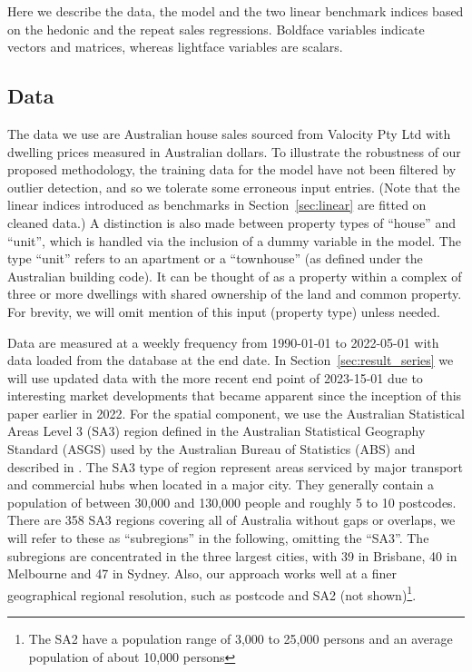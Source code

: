 Here we describe the data, the model and the two linear benchmark indices based on the hedonic and the repeat sales regressions. Boldface variables indicate vectors and matrices, whereas lightface variables are scalars.

\subsection{Data}
\label{sec:subregions}

The data we use are Australian house sales sourced from Valocity Pty Ltd with dwelling prices measured in Australian dollars. 
To illustrate the robustness of our proposed methodology, the training data for the model have not been filtered by outlier detection, and so we tolerate some erroneous input entries. (Note that the linear indices introduced as benchmarks in Section~\ref{sec:linear} are fitted on cleaned data.) A distinction is also made between property types of ``house'' and ``unit'', which is handled via the inclusion of a dummy variable in the model. The type “unit” refers to an apartment or a “townhouse” (as defined under the Australian building code). It can be thought of as a property within a complex of three or more dwellings with shared ownership of the land and common property. For brevity, we will omit mention of this input (property type) unless needed. 

Data are measured at a weekly frequency from 1990-01-01 to 2022-05-01 with data loaded from the database at the end date. In Section~\ref{sec:result_series} we will use updated data with the more recent end point of 2023-15-01 due to interesting market developments that became apparent since the inception of this paper earlier in 2022. For the spatial component, we use the Australian Statistical Areas Level 3 (SA3) region defined in the Australian Statistical Geography Standard (ASGS) used by the Australian Bureau of Statistics (ABS) and described in \cite{abs:2021}. The SA3 type of region represent areas serviced by major transport and commercial hubs when located in a major city. They generally contain a population of between 30,000 and 130,000 people and roughly 5 to 10 postcodes. There are 358 SA3 regions covering all of Australia without gaps or overlaps, we will refer to these as ``subregions'' in the following, omitting the ``SA3''. The subregions are concentrated in the three largest cities, with 39 in Brisbane, 40 in Melbourne and 47 in Sydney.
 Also, our approach works well at a finer geographical regional resolution, such as postcode and SA2 (not shown)\footnote{The SA2 have a population range of 3,000 to 25,000 persons and an average population of about 10,000 persons}. 


